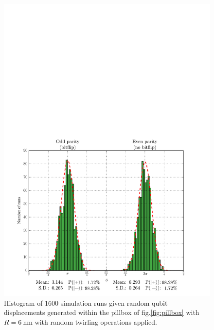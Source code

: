 



\begin{figure}
	\centering
	\includegraphics[width=\columnwidth]{../Figures/Displacement_Histogram.pdf}	
	\caption{Histogram of 1600 simulation runs given random qubit displacements generated within the pillbox of fig.\@ \ref{fig:pillbox} with $R = \SI{6}{\nano\metre}$ with random twirling operations applied. }
	\label{fig:DisplacementHistogram}
\end{figure}